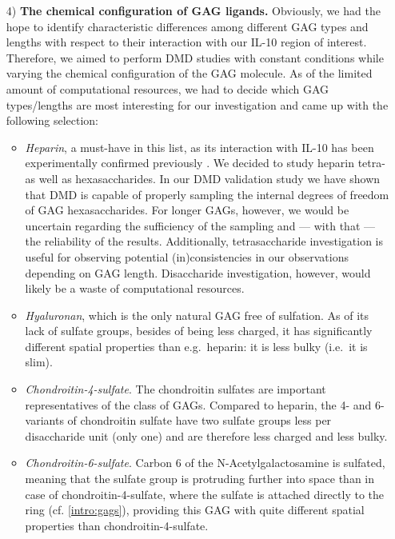 \begin{itemize}
\item[4)] \textbf{The chemical configuration of GAG ligands.} Obviously, we had
the hope to identify characteristic differences among different GAG types and
lengths with respect to their interaction with our IL-10 region of interest.
Therefore, we aimed to perform DMD studies with constant conditions while
varying the chemical configuration of the GAG molecule. As of the limited amount
of computational resources, we had to decide which GAG types/lengths are most
interesting for our investigation and came up with the following selection:

\begin{itemize}

\item \textit{Heparin}, a must-have in this list, as its interaction with IL-10
has been experimentally confirmed previously \cite{salek_ardakani_2000}. We
decided to study heparin tetra- as well as hexasaccharides. In our DMD
validation study we have shown that DMD is capable of properly sampling the
internal degrees of freedom of GAG hexasaccharides. For longer GAGs, however, we
would be uncertain regarding the sufficiency of the sampling and --- with that
--- the reliability of the results. Additionally, tetrasaccharide investigation
is useful for observing potential (in)consistencies in our observations
depending on GAG length. Disaccharide investigation, however, would likely be a
waste of computational resources.

\item \textit{Hyaluronan}, which is the only natural GAG free of sulfation. As
of its lack of sulfate groups, besides of being less charged, it has
significantly different spatial properties than e.g.\ heparin: it is less bulky
(i.e.\ it is slim).

\item \textit{Chondroitin-4-sulfate}. The chondroitin sulfates are important
representatives of the class of GAGs. Compared to heparin, the 4- and 6-
variants of chondroitin sulfate have two sulfate groups less per disaccharide
unit (only one) and are therefore less charged and less bulky.

\item \textit{Chondroitin-6-sulfate}. Carbon 6 of the
N-Acetyl\-ga\-lacto\-sa\-mine is sulfated, meaning that the sulfate group is
protruding further into space than in case of chondroitin-4-sulfate, where the
sulfate is attached directly to the ring (cf. \cref{intro:gags}), providing this
GAG with quite different spatial properties than chondroitin-4-sulfate.

\end{itemize}

\end{itemize}

